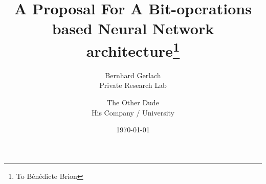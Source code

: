 \title{A Proposal For A Bit-operations based Neural Network architecture\thanks{To Bénédicte Brion}}
\author{Bernhard Gerlach  \\
	Private Research Lab  \\
	\and 
	The Other Dude \\
	His Company / University \\
	}

\date{\today}
